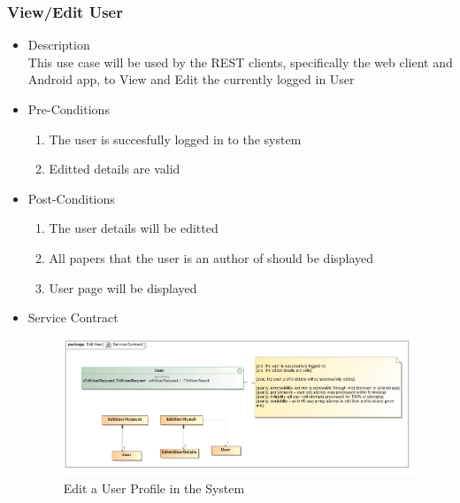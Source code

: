 \documentclass[a4paper,10pt]{article}
\begin{document}
\subsubsection{View/Edit User}
	\begin{itemize}
		\item Description\\
			This use case will be used by the REST clients, specifically the web client and Android app, to View and Edit the currently logged in User
		\item Pre-Conditions
			\begin{enumerate}
				\item The user is succesfully logged in to the system
				\item Editted details are valid
			\end{enumerate}
		\item Post-Conditions
			\begin{enumerate}
				\item The user details will be editted
				\item All papers that the user is an author of should be displayed 
				\item User page will be displayed
						
			\end{enumerate}
		\item Service Contract
				\begin{figure}[H]
				\includegraphics[scale=0.5]{Edit_User}
				\caption{Edit a User Profile in the System}	
				\end{figure}
	\end{itemize}
\end{document}
